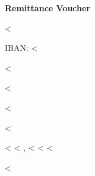 \documentclass{scrartcl}
\begin{document}
\fontsize{9pt}{10pt}\selectfont

\vspace*{1cm}

\textbf{Remittance Voucher}

\hfill <%

IBAN: <%

<%

\vspace{0.3cm}

<%

<%

<%

<%
<%
\hspace{-1mm}, <%
<%
<%

<%
\end{document}
